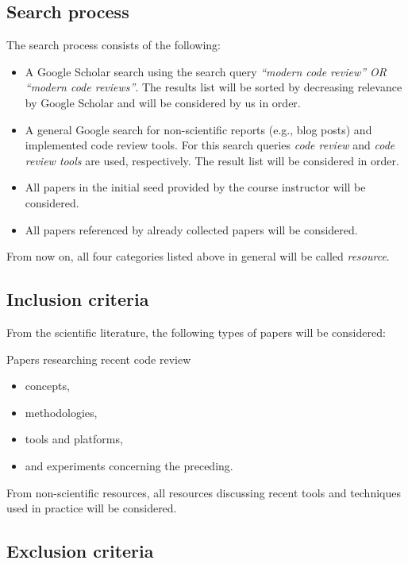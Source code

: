 \documentclass[]{book}
\providecommand{\tightlist}{%
  \setlength{\itemsep}{0pt}\setlength{\parskip}{0pt}}
\begin{document}
\subsection{Search process}\label{search-process}

The search process consists of the following:

\begin{itemize}
\tightlist
\item
  A Google Scholar search using the search query \emph{``modern code
  review'' OR ``modern code reviews''}. The results list will be sorted
  by decreasing relevance by Google Scholar and will be considered by us
  in order.
\item
  A general Google search for non-scientific reports (e.g., blog posts)
  and implemented code review tools. For this search queries \emph{code
  review} and \emph{code review tools} are used, respectively. The
  result list will be considered in order.
\item
  All papers in the initial seed provided by the course instructor will
  be considered.
\item
  All papers referenced by already collected papers will be considered.
\end{itemize}

From now on, all four categories listed above in general will be called
\emph{resource}.

\subsection{Inclusion criteria}\label{inclusion-criteria}

From the scientific literature, the following types of papers will be
considered:

Papers researching recent code review

\begin{itemize}
\tightlist
\item
  concepts,
\item
  methodologies,
\item
  tools and platforms,
\item
  and experiments concerning the preceding.
\end{itemize}

From non-scientific resources, all resources discussing recent tools and
techniques used in practice will be considered.

\subsection{Exclusion criteria}\label{exclusion-criteria}
\end{document}

